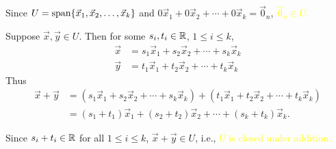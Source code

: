 \documentclass[pdf,9pt]{beamer}
\begin{document}
\begin{frame}[fragile]

\begin{proofnoend}
    Since $U=\mbox{span} \{ \vec{x}_1, \vec{x}_2, \ldots, \vec{x}_k\}$ and
    $0\vec{x}_1 + 0\vec{x}_2 + \cdots + 0\vec{x}_k=\vec{0}_n$,
    \textcolor{yellow}{$\vec{0}_n\in U$.}
    \pause
    \bigskip

    Suppose $\vec{x},\vec{y}\in U$.
    Then for some $s_i,t_i\in\mathbb{R}$, $1\leq i\leq k$,
    \begin{align*}
	\vec{x}&=s_1\vec{x}_1 + s_2\vec{x}_2 + \cdots + s_k\vec{x}_k  \\
	\vec{y}&=t_1\vec{x}_1 + t_2\vec{x}_2 + \cdots + t_k\vec{x}_k
    \end{align*}
    Thus
    \begin{align*}
	\vec{x}+\vec{y} & =  (s_1\vec{x}_1 + s_2\vec{x}_2 + \cdots + s_k\vec{x}_k)
	+(t_1\vec{x}_1 + t_2\vec{x}_2 + \cdots + t_k\vec{x}_k) \\
	& =  (s_1+t_1)\vec{x}_1 + (s_2+t_2)\vec{x}_2 + \cdots + (s_k+t_k)\vec{x}_k.
    \end{align*}

    Since $s_i+t_i\in\mathbb{R}$ for all $1\leq i\leq k$,
    $\vec{x}+\vec{y}\in U$, i.e., \textcolor{yellow}{$U$ is closed under addition.}
\end{proofnoend}


\end{frame}
\end{document}
